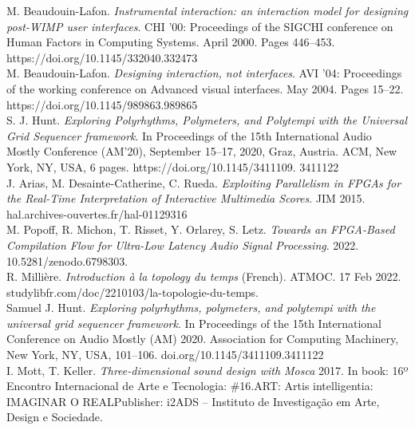 \documentclass[journal,onecolumn]{IEEEtran}
\begin{document}
\begin{thebibliography}{1}
M. Beaudouin-Lafon. \emph{Instrumental interaction: an interaction model for designing post-WIMP user interfaces}. CHI '00: Proceedings of the SIGCHI conference on Human Factors in Computing Systems. April 2000. Pages 446–453. https://doi.org/10.1145/332040.332473 \\

M. Beaudouin-Lafon. \emph{Designing interaction, not interfaces}. AVI '04: Proceedings of the working conference on Advanced visual interfaces. May 2004. Pages 15–22. https://doi.org/10.1145/989863.989865 \\

S. J. Hunt. \emph{Exploring Polyrhythms, Polymeters, and Polytempi
with the Universal Grid Sequencer framework}. In Proceedings of the 15th
International Audio Mostly Conference (AM’20), September 15–17, 2020, Graz, Austria. ACM, New York, NY, USA, 6 pages. https://doi.org/10.1145/3411109.
3411122 \\

J. Arias, M. Desainte-Catherine, C. Rueda. \emph{Exploiting Parallelism in FPGAs for the Real-Time Interpretation of Interactive Multimedia Scores}. JIM 2015. hal.archives-ouvertes.fr/hal-01129316 \\

M. Popoff, R. Michon, T. Risset, Y. Orlarey, S. Letz. \emph{Towards an FPGA-Based Compilation Flow for Ultra-Low Latency Audio Signal Processing}. 2022. 10.5281/zenodo.6798303. \\

R. Millière. \emph{Introduction à la topology du temps} (French). ATMOC. 17 Feb 2022. studylibfr.com/doc/2210103/la-topologie-du-temps. \\

Samuel J. Hunt. \emph{Exploring polyrhythms, polymeters, and polytempi with the universal grid sequencer framework}. In Proceedings of the 15th International Conference on Audio Mostly (AM) 2020. Association for Computing Machinery, New York, NY, USA, 101–106. doi.org/10.1145/3411109.3411122 \\

I. Mott, T. Keller. \emph{Three-dimensional sound design with Mosca} 
2017. In book: 16º Encontro Internacional de Arte e Tecnologia: \#16.ART: Artis intelligentia: IMAGINAR O REALPublisher: i2ADS – Instituto de Investigação em Arte, Design e Sociedade. \\


\end{thebibliography}
\end{document}
